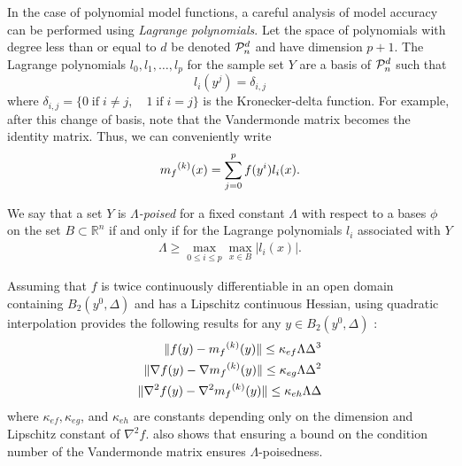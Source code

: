 In the case of polynomial model functions, a careful analysis of model accuracy can be performed using \emph{Lagrange polynomials}.
Let the space of polynomials with degree less than or equal to $d$ be denoted $\mathcal{P}^d_n$ and have dimension $p+1$.
The Lagrange polynomials $l_0, l_1, \ldots, l_p$ for the sample set $Y$ are a basis of $\mathcal{P}^d_n$ such that
\[
l_i(y^j) = \delta_{i,j}
\]
where $\delta_{i,j} = \{0 \;\text{if}\; i\ne j,\quad 1 \;\text{if} \; i = j \}$ is the Kronecker-delta function.
For example, after this change of basis, note that the Vandermonde matrix becomes the identity matrix.
Thus, we can conveniently write
\[
\label{reg}
{{m}_f}^{(k)}(x) = \sum^p_{j=0}f(y^i)l_i(x).
\]

We say that a set $Y$ is \emph{$\Lambda$-poised} for a fixed constant $\Lambda$ with respect to a bases $\phi$ on the set 
$B \subset \mathbb R^n$ if and only if for the Lagrange polynomials $l_i$ associated with $Y$
\begin{align}
\Lambda \ge \max_{0\le i\le p}\max_{x\in B}|l_i(x)|.
\end{align}


Assuming that $f$ is twice continuously differentiable in an open domain containing $B_2(y^0, \Delta)$ and has a Lipschitz continuous Hessian, using quadratic interpolation provides the following results for any $y \in B_2(y^0, \Delta)$ \cite{DUMMY:intro_book}:
\begin{align}
 \label{fully_quadratic}
 \|f(y) - {{m}_f}^{(k)}(y)\| \le \kappa_{ef} \Lambda \Delta^3 \\
 \|\nabla f(y) - \nabla {{m}_f}^{(k)}(y)\| \le \kappa_{eg} \Lambda \Delta^2 \\
 \|\nabla^2 f(y) - \nabla^2 {{m}_f}^{(k)}(y)\| \le \kappa_{eh}\Lambda \Delta \\
\end{align}
where
$\kappa_{ef}, \kappa_{eg}$, and $\kappa_{eh}$ are constants depending only on the dimension and Lipschitz constant of $\nabla^2 f$.
\cite{DUMMY:intro_book} also shows that ensuring a bound on the condition number of the Vandermonde matrix ensures $\Lambda$-poisedness.

